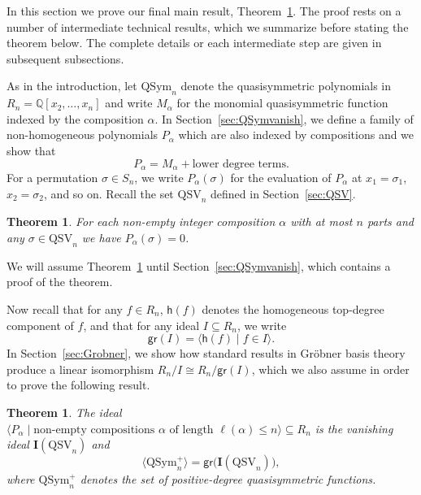 \documentclass[12pt]{amsart}
\newtheorem{thm}[equation]{Theorem}
\theoremstyle{definition}
\theoremstyle{remark}
\numberwithin{equation}{section}
\newcommand{\QQ}{\mathbb{Q}}
\newcommand{\QSym}{\mathrm{QSym}}
\newcommand{\QSV}{\mathrm{QSV}}
\begin{document}
In this section we prove our final main result, Theorem~\ref{thm:vanishingQSV}.  
The proof rests on a number of intermediate technical results, which we summarize before stating the theorem below.  
The complete details or each intermediate step are given in subsequent subsections.

As in the introduction, let $\QSym_{n}$ denote the quasisymmetric polynomials in $R_{n} = \QQ[x_{2}, \ldots, x_{n}]$ and write $M_{\alpha}$ for the monomial quasisymmetric function indexed by the composition $\alpha$.  In Section~\ref{sec:QSymvanish}, we define a family of non-homogeneous polynomials $P_{\alpha}$ which are also indexed by compositions and we show that
\begin{equation}
\label{eq:Palphahomogeneous}
P_{\alpha} = M_{\alpha} + \text{lower degree terms}.
\end{equation}
For a permutation $\sigma \in S_{n}$, we write $P_{\alpha}(\sigma)$ for the evaluation of $P_{\alpha}$ at $x_{1} = \sigma_{1}$, $x_{2} = \sigma_{2}$, and so on.  Recall the set $\QSV_{n}$ defined in Section~\ref{sec:QSV}.

\begin{thm}
\label{thm:vanishing}
For each non-empty integer composition $\alpha$ with at most $n$ parts and any $\sigma\in \QSV_n$ we have $P_{\alpha} (\sigma)=0$.
\end{thm}

We will assume Theorem~\ref{thm:vanishing} until Section~\ref{sec:QSymvanish}, which contains a proof of the theorem.

Now recall that for any $f \in R_{n}$, $\mathsf{h}(f)$ denotes the homogeneous top-degree component of $f$, and that for any ideal $I \subseteq R_{n}$, we write
\[
\mathsf{gr}(I) = \langle \mathsf{h}(f) \;|\; f \in I \rangle.
\]
In Section~\ref{sec:Grobner}, we show how standard results in Gr\"{o}bner basis theory produce a linear isomorphism $R_{n}/I \cong R_{n} / \mathsf{gr}(I)$, which we also assume in order to prove the following result.

\begin{thm}\label{thm:vanishingQSV} 
The ideal $\langle P_{\alpha} \;|\; \text{non-empty compositions $\alpha$ of length $\ell(\alpha) \le n$} \rangle \subseteq R_n$ is the vanishing ideal $\mathbf{I}(\QSV_n)$ and 
\[
\langle \QSym_{n}^{+} \rangle = \mathsf{gr}\big(\mathbf{I}(\QSV_{n})\big),
\]
where  $\QSym_{n}^{+}$ denotes the set of positive-degree quasisymmetric functions.
 \end{thm}
 
\end{document}
